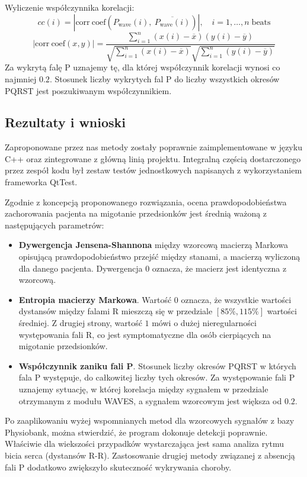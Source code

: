 Wyliczenie współczynnika korelacji:
\begin{equation}
cc(i) = |\mathrm{corr\:coef}(P_\mathrm{wave}(i),\: \overline{P_\mathrm{wave}(i)})|, \quad i = 1,\ldots,n\; \mathrm{beats}
\end{equation}
\begin{equation}
  |\mathrm{corr\:coef}(x,y)| = 
  \frac
      {\sum_{i=1}^{n}(x(i) - \overline{x})(y(i) - \overline{y})}
      {
        \sqrt{\sum_{i=1}^{n}(x(i) - \overline{x})}
        \sqrt{\sum_{i=1}^{n}(y(i) - \overline{y})}
      }
\end{equation}
Za wykrytą falę P uznajemy tę, dla której współczynnik korelacji wynosi co najmniej $0.2$.
Stosunek liczby wykrytych fal P do liczby wszystkich okresów PQRST jest poszukiwanym współczynnikiem.

\subsection{Rezultaty i wnioski}
Zaproponowane przez nas metody zostały poprawnie zaimplementowane w języku C++ oraz zintegrowane z główną linią projektu.
Integralną częścią dostarczonego przez zespół kodu był zestaw testów jednostkowych napisanych 
z wykorzystaniem frameworka QtTest.

Zgodnie z koncepcją proponowanego rozwiązania, ocena prawdopodobieństwa zachorowania pacjenta na migotanie przedsionków
jest średnią ważoną z następujących parametrów:
\begin{itemize}
 \item \textbf{Dywergencja Jensena-Shannona} między wzorcową macierzą Markowa opisującą prawdopodobieństwo przejść między stanami,
 a macierzą wyliczoną dla danego pacjenta. 
 Dywergencja $0$ oznacza, że macierz jest identyczna z wzorcową. 
 
 \item \textbf{Entropia macierzy Markowa}.
 Wartość $0$ oznacza, że wszystkie wartości dystansów między falami R mieszczą się w przedziale $[85\%,115\%]$ wartości średniej.
 Z drugiej strony, wartość $1$ mówi o dużej nieregularności występowania fali R, 
 co jest symptomatyczne dla osób cierpiących na migotanie przedsionków.
 
 \item \textbf{Współczynnik zaniku fali P}. 
 Stosunek liczby okresów PQRST w których fala P występuje, do całkowitej liczby tych okresów.
 Za występowanie fali P uznajemy sytuację, w której korelacja między sygnałem w przedziale otrzymanym z modułu WAVES,
 a sygnałem wzorcowym jest większa od $0.2$.
 
\end{itemize}
Po zaaplikowaniu wyżej wspomnianych metod dla wzorcowych sygnałów z bazy Physiobank, 
można stwierdzić, że program dokonuje detekcji poprawnie. 
Właściwie dla wiekszości przypadków wystarczająca jest sama analiza rytmu bicia serca (dystansów R-R).
Zastosowanie drugiej metody związanej z absencją fali P dodatkowo zwiększyło skuteczność wykrywania choroby.

